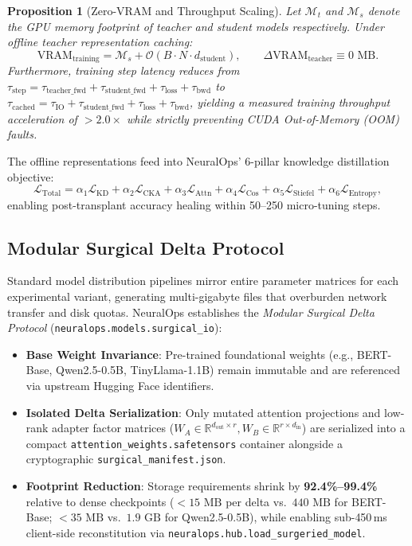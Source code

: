 \documentclass{article}
\newtheorem{proposition}[theorem]{Proposition}
\begin{document}
\begin{proposition}[Zero-VRAM and Throughput Scaling]
Let $\mathcal{M}_t$ and $\mathcal{M}_s$ denote the GPU memory footprint of teacher and student models respectively. Under offline teacher representation caching:
\begin{equation}
    \text{VRAM}_{\text{training}} = \mathcal{M}_s + \mathcal{O}(B \cdot N \cdot d_{\text{student}}), \qquad \Delta \text{VRAM}_{\text{teacher}} \equiv 0\text{ MB}.
\end{equation}
Furthermore, training step latency reduces from $\tau_{\text{step}} = \tau_{\text{teacher\_fwd}} + \tau_{\text{student\_fwd}} + \tau_{\text{loss}} + \tau_{\text{bwd}}$ to $\tau_{\text{cached}} = \tau_{\text{IO}} + \tau_{\text{student\_fwd}} + \tau_{\text{loss}} + \tau_{\text{bwd}}$, yielding a measured training throughput acceleration of $>2.0\times$ while strictly preventing CUDA Out-of-Memory (OOM) faults.
\end{proposition}

The offline representations feed into NeuralOps' 6-pillar knowledge distillation objective:
\begin{equation}
    \mathcal{L}_{\text{Total}} = \alpha_1 \mathcal{L}_{\text{KD}} + \alpha_2 \mathcal{L}_{\text{CKA}} + \alpha_3 \mathcal{L}_{\text{Attn}} + \alpha_4 \mathcal{L}_{\text{Cos}} + \alpha_5 \mathcal{L}_{\text{Stiefel}} + \alpha_6 \mathcal{L}_{\text{Entropy}},
\end{equation}
enabling post-transplant accuracy healing within 50--250 micro-tuning steps.

\subsection{Modular Surgical Delta Protocol}
\label{sec:modular_deltas}
Standard model distribution pipelines mirror entire parameter matrices for each experimental variant, generating multi-gigabyte files that overburden network transfer and disk quotas. NeuralOps establishes the \emph{Modular Surgical Delta Protocol} (\texttt{neuralops.models.surgical\_io}):
\begin{itemize}
    \item \textbf{Base Weight Invariance}: Pre-trained foundational weights (e.g., BERT-Base, Qwen2.5-0.5B, TinyLlama-1.1B) remain immutable and are referenced via upstream Hugging Face identifiers.
    \item \textbf{Isolated Delta Serialization}: Only mutated attention projections and low-rank adapter factor matrices ($W_A \in \mathbb{R}^{d_{\text{out}} \times r}, W_B \in \mathbb{R}^{r \times d_{\text{in}}}$) are serialized into a compact \texttt{attention\_weights.safetensors} container alongside a cryptographic \texttt{surgical\_manifest.json}.
    \item \textbf{Footprint Reduction}: Storage requirements shrink by \textbf{92.4\%--99.4\%} relative to dense checkpoints ($<15\text{ MB}$ per delta vs.\ $440\text{ MB}$ for BERT-Base; $<35\text{ MB}$ vs.\ $1.9\text{ GB}$ for Qwen2.5-0.5B), while enabling sub-450\,ms client-side reconstitution via \texttt{neuralops.hub.load\_surgeried\_model}.
\end{itemize}
\end{document}
